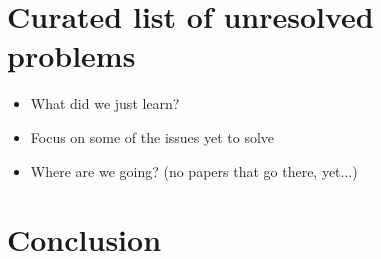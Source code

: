 \documentclass[11pt]{sdm}
\begin{document}

\section{Curated list of unresolved problems}
\begin{itemize}
    \item What did we just learn?
    \item Focus on some of the issues yet to solve
    \item Where are we going? (no papers that go there, yet...)
\end{itemize}

\section{Conclusion}

\printbibliography 
\end{document}
